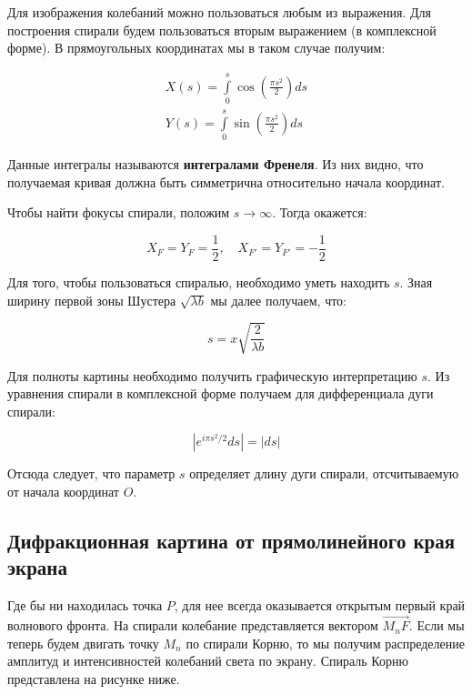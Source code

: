 Для изображения колебаний можно пользоваться любым из выражения. Для построения спирали будем пользоваться вторым выражением (в комплексной форме). В прямоугольных координатах мы в таком случае получим:

\begin{align*}
	X(s) = \int\limits_0^s \cos\left(\frac{\pi s^2}{2}\right) d s \\
	Y(s) = \int\limits_0^s \sin\left(\frac{\pi s^2}{2}\right) d s
\end{align*}

Данные интегралы называются \textbf{интегралами Френеля}. Из них видно, что получаемая кривая должна быть симметрична относительно начала координат.

Чтобы найти фокусы спирали, положим $s \rightarrow \infty$. Тогда окажется:

\begin{equation*}
	X_F = Y_F = \frac{1}{2}, \quad X_{F'} = Y_{F'} = -\frac{1}{2}
\end{equation*}

Для того, чтобы пользоваться спиралью, необходимо уметь находить $s$. Зная ширину первой зоны Шустера $\sqrt{\lambda b}$ мы далее получаем, что:

\begin{equation*}
	s = x \sqrt{\frac{2}{\lambda b}}
\end{equation*}

Для полноты картины необходимо получить графическую интерпретацию $s$. Из уравнения спирали в комплексной форме получаем для дифференциала дуги спирали:

\begin{equation*}
	\left|e^{i \pi s^2 / 2} d s\right| = |ds|
\end{equation*}

Отсюда следует, что параметр $s$ определяет длину дуги спирали, отсчитываемую от начала координат $O$.

\subsection{Дифракционная картина от прямолинейного края экрана}

Где бы ни находилась точка $P$, для нее всегда оказывается открытым первый край волнового фронта. На спирали колебание представляется вектором $\overrightarrow{M_n F}$. Если мы теперь будем двигать точку $M_n$ по спирали Корню, то мы получим распределение амплитуд и интенсивностей колебаний света по экрану. Спираль Корню представлена на рисунке ниже.

